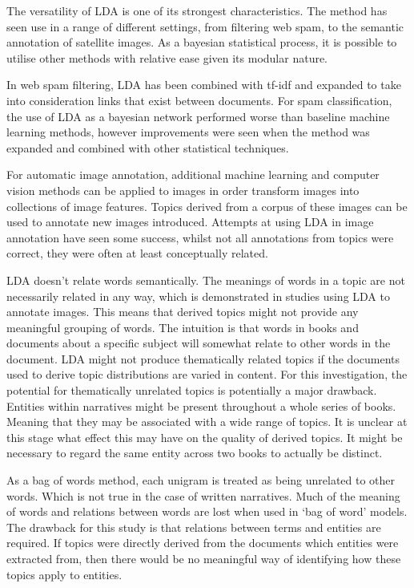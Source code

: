 \documentclass[10pt]{report}
\begin{document}
The versatility of LDA is one of its strongest characteristics. The method has seen use in a range of different settings, from filtering web spam, to the semantic annotation of satellite images. As a bayesian statistical process, it is possible to utilise other methods with relative ease given its modular nature.

In web spam filtering, LDA has been combined with tf-idf and expanded to take into consideration links that exist between documents. For spam classification, the use of LDA as a bayesian network performed worse than baseline machine learning methods, however improvements were seen when the method was expanded and combined with other statistical techniques.~\cite{Biro2008-ld}

For automatic image annotation, additional machine learning and computer vision methods can be applied to images in order transform images into collections of image features. Topics derived from a corpus of these images can be used to annotate new images introduced. Attempts at using LDA in image annotation have seen some success, whilst not all annotations from topics were correct, they were often at least conceptually related.~\cite{Feng2010-dp, Zhang2011-dn}

LDA doesn’t relate words semantically. The meanings of words in a topic are not necessarily related in any way, which is demonstrated in studies using LDA to annotate images. This means that derived topics might not provide any meaningful grouping of words. The intuition is that words in books and documents about a specific subject will somewhat relate to other words in the document. LDA might not produce thematically related topics if the documents used to derive topic distributions are varied in content. For this investigation, the potential for thematically unrelated topics is potentially a major drawback. Entities within narratives might be present throughout a whole series of books. Meaning that they may be associated with a wide range of topics. It is unclear at this stage what effect this may have on the quality of derived topics. It might be necessary to regard the same entity across two books to actually be distinct.

As a bag of words method, each unigram is treated as being unrelated to other words. Which is not true in the case of written narratives. Much of the meaning of words and relations between words are lost when used in ‘bag of word’ models. The drawback for this study is that relations between terms and entities are required. If topics were directly derived from the documents which entities were extracted from, then there would be no meaningful way of identifying how these topics apply to entities.
\end{document}
